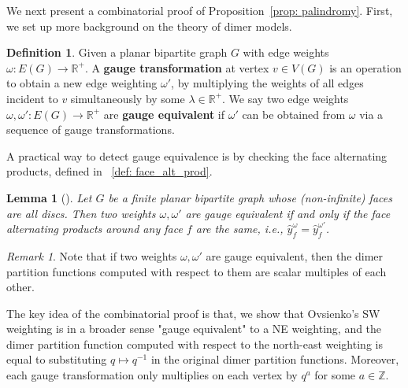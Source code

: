\documentclass[11pt]{amsart}
\newtheorem{lem}[thm]{Lemma}
\theoremstyle{definition}
\newtheorem{defn}[thm]{Definition}
\theoremstyle{remark}
\newtheorem{rem}[thm]{Remark}
\numberwithin{equation}{section}
\begin{document}
We next present a combinatorial proof of Proposition~\ref{prop: palindromy}. First, we set up more background on the theory of dimer models. 

\begin{defn}
    Given a planar bipartite graph $G$ with edge weights $\omega: E(G)\rightarrow \mathbb{R}^+$. A \textbf{gauge transformation} at vertex $v\in V(G)$ is an operation to obtain a new edge weighting $\omega'$, by multiplying the weights of all edges incident to $v$ simultaneously by some $\lambda\in \mathbb{R}^+$. We say two edge weights $\omega,\omega': E(G)\rightarrow \mathbb{R}^+$ are \textbf{gauge equivalent} if $\omega'$ can be obtained from $\omega$ via a sequence of gauge transformations.
\end{defn}

A practical way to detect gauge equivalence is by checking the face alternating products, defined in ~\ref{def: face_alt_prod}. 

\begin{lem}[{\cite[Section 3.2]{kenyon2009lecturesdimers}}]
    Let $G$ be a finite planar bipartite graph whose (non-infinite) faces are all discs. Then two weights $\omega,\omega'$ are gauge equivalent if and only if the face alternating products around any face $f$ are the same, i.e., $\hat{y}^{\omega}_f = \hat{y}^{\omega'}_f$.
\end{lem}

\begin{rem}
    Note that if two weights $\omega,\omega'$ are gauge equivalent, then the dimer partition functions computed with respect to them are scalar multiples of each other. 
\end{rem}

The key idea of the combinatorial proof is that, we show that Ovsienko's SW weighting is in a broader sense "gauge equivalent" to a NE weighting, and the dimer partition function computed with respect to the north-east weighting is equal to substituting $q\mapsto q^{-1}$ in the original dimer partition functions. Moreover, each gauge transformation only multiplies on each vertex by $q^{a}$ for some $a\in \mathbb{Z}$. 
\end{document}
